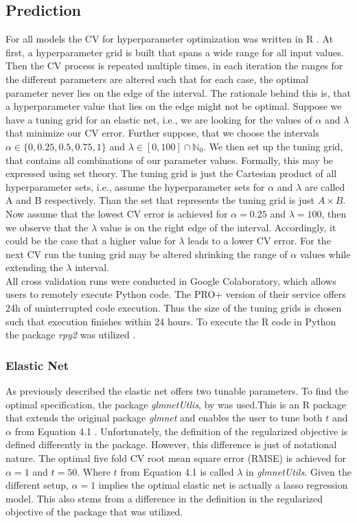 \documentclass[a4paper,12pt, headsepline]{scrartcl}
\numberwithin{equation}{section}
\begin{document}
\subsection{Prediction}\label{subsec:pred}
For all models the CV for hyperparameter optimization was written in R \citep{R}. At first, a hyperparameter grid is built that spans a wide range for all input values. Then the CV process is repeated multiple times, in each iteration the ranges for the different parameters are altered such that for each case, the optimal parameter never lies on the edge of the interval. The rationale behind this is, that a hyperparameter value that lies on the edge might not be optimal. Suppose we have a tuning grid for an elastic net, i.e., we are looking for the values of $\alpha$ and $\lambda$ that minimize our CV error. Further suppose, that we choose the intervals $\alpha \in \{0, 0.25, 0.5, 0.75, 1\}$ and $\lambda \in [0, 100] \cap \mathbb{N}_0$. We then set up the tuning grid, that contains all combinations of our parameter values. Formally, this may be expressed using set theory. The tuning grid is just the Cartesian product of all hyperparameter sets, i.e., assume the hyperparameter sets for $\alpha$ and $\lambda$ are called A and B respectively. Than the set that represents the tuning grid is just $A \times B$. Now assume that the lowest CV error is achieved for $\alpha = 0.25$ and $\lambda = 100$, then we observe that the $\lambda$ value is on the right edge of the interval. Accordingly, it could be the case that a higher value for $\lambda$ leads to a lower CV error. For the next CV run the tuning grid may be altered shrinking the range of $\alpha$ values while extending the $\lambda$ interval.\\
All cross validation runs were conducted in Google Colaboratory, which allows users to remotely execute Python code. The PRO+ version of their service offers 24h of uninterrupted code execution. Thus the size of the tuning grids is chosen such that execution finishes within 24 hours. To execute the R code in Python the package \textit{rpy2} was utilized \citep{rpy2}.

\subsubsection{Elastic Net}
As previously described the elastic net offers two tunable parameters. To find the optimal specification, the package \textit{glmnetUtlis}, by \citet{glmnetUtils} was used.This is an R package that extends the original package \textit{glmnet} and enables the user to tune both $t$ and $\alpha$ from Equation 4.1 \citep{glmnet}. Unfortunately, the definition of the regularized objective is defined differently in the package. However, this difference is just of notational nature. The optimal five fold CV root mean square error (RMSE) is achieved for $\alpha = 1$ and $t = 50$. Where $t$ from Equation 4.1 is called $\lambda$ in \textit{glmnetUtils}. Given the different setup, $\alpha = 1$ implies the optimal elastic net is actually a lasso regression model. This also stems from a difference in the definition in the regularized objective of the package that was utilized. 
\end{document}
